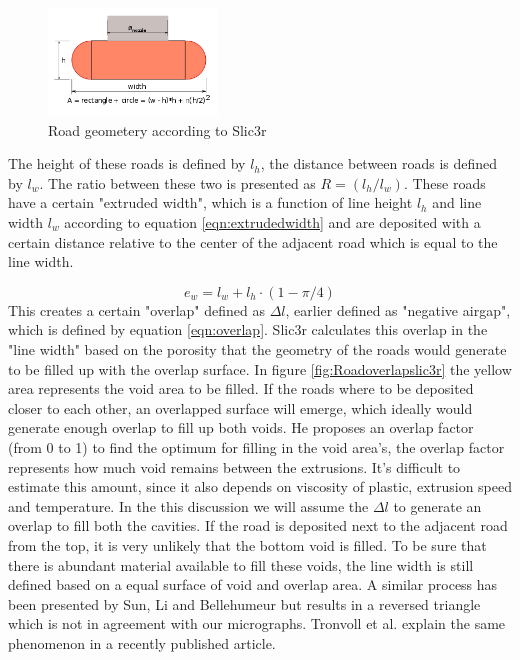 \begin{figure}[H]
   \centering
    \includegraphics[width=0.40\textwidth]{chapter_2/figures/Slic3rshape.png}
    \caption{Road geometery according to Slic3r \cite{GaryHodgsonSlic3rMath}}
    \label{fig:Slic3rshape}
\end{figure}

The height of these roads is defined by $l_h$, the distance between roads is defined by $l_w$. The ratio between these two is presented as $R=(l_h/l_w)$.
These roads have a certain "extruded width", which is a function of line height $l_h$ and line width $l_w$ according to equation \ref{eqn:extrudedwidth} and are deposited with a certain distance relative to the center of the adjacent road which is equal to the line width. 

\begin{equation} \label{eqn:extrudedwidth}
e_w=l_w+l_h\cdot(1-\pi/4)
\end{equation}
This creates a certain "overlap" defined as $\Delta l$, earlier defined as "negative airgap", which is defined by equation \ref{eqn:overlap}. Slic3r calculates this overlap in the "line width" based on the porosity that the geometry of the roads would generate to be filled up with the overlap surface. In figure \ref{fig:Roadoverlapslic3r} the yellow area represents the void area to be filled. If the roads where to be deposited closer to each other, an overlapped surface will emerge, which ideally would generate enough overlap to fill up both voids. He proposes an overlap factor (from 0 to 1) to find the optimum for filling in the void area's, the overlap factor represents how much void remains between the extrusions. It's difficult to estimate this amount, since it also depends on viscosity of plastic, extrusion speed and temperature. In the this discussion we will assume the $\Delta l$ to generate an overlap to fill both the cavities. 
If the road is deposited next to the adjacent road from the top, it is very unlikely that the bottom void is filled. To be sure that there is abundant material available to fill these voids, the line width is still defined based on a equal surface of void and overlap area. A similar process has been presented by Sun, Li and Bellehumeur \cite{Li2002CompositeProperties} but results in a reversed triangle which is not in agreement with our micrographs. Tronvoll et al. \cite{TronvollTheApproach} explain the same phenomenon in a recently published article.


